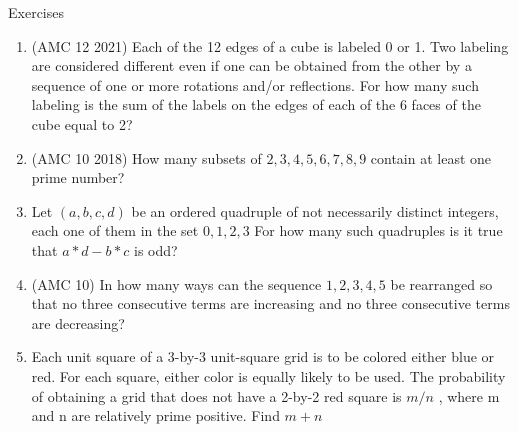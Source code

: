 \begin{xcb}{Exercises}
\begin{enumerate}
\begin{hint}
\end{hint}
\item(AMC 12 2021)  Each of the 12 edges of a cube is labeled 0 or 1. Two labeling are considered different even if one can be obtained from the other by a sequence of one or more rotations and/or reflections. For how many such labeling is the sum of the labels on the edges of each of the 6 faces of the cube equal to 2?
\begin{hint}
\end{hint}
\item(AMC 10 2018)  How many subsets of ${2, 3, 4, 5, 6, 7, 8, 9}$ contain at least one prime number?
\item {} Let $(a, b, c, d)$ be an ordered quadruple of not necessarily distinct integers, each one of them in the set $0, 1, 2, 3$ For how many such quadruples is it true that $a*d -b*c$ is odd?
\item (AMC 10)  In how many ways can the sequence $1, 2, 3, 4, 5$ be rearranged so that no three consecutive terms are increasing and no three consecutive terms are decreasing?
\item {} Each unit square of a 3-by-3 unit-square grid is to be colored either blue or red. For each square, either color is equally likely to be used. The probability of obtaining a grid that does not have a 2-by-2 red square is $m/n$ , where m and n are relatively prime positive. Find $m+n$
\begin{hint}
\end{hint}
\end{enumerate}
\end{xcb}
